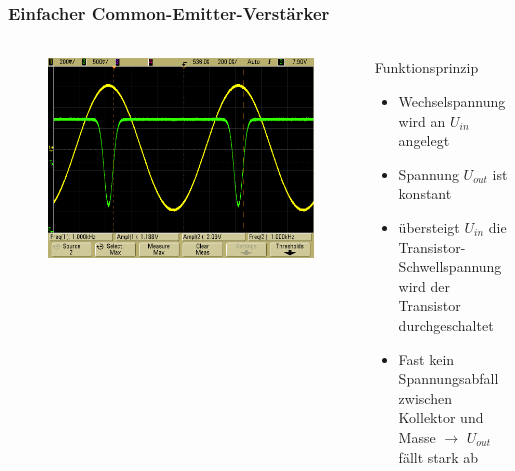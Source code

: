 \begin{frame}
    \frametitle{Einfacher Common-Emitter-Verstärker}
    \framesubtitle{}
    \begin{columns}[c]
        \begin{figure}[H]
        \begin{center}
                \includegraphics[scale=0.15]{./img/oszi/Aufgabe31.png}
        \end{center}
        \end{figure}
        \begin{block}{Funktionsprinzip}
            \begin{itemize}
                \item Wechselspannung wird an $U_{in}$ angelegt
                \item Spannung $U_{out}$ ist konstant
                \item übersteigt $U_{in}$ die Transistor-Schwellspannung wird
                der Transistor durchgeschaltet
                \item Fast kein Spannungsabfall zwischen Kollektor und Masse
                $\rightarrow$ $U_{out}$ fällt stark ab
            \end{itemize}    
         \end{block}
    \end{columns}
\end{frame}
